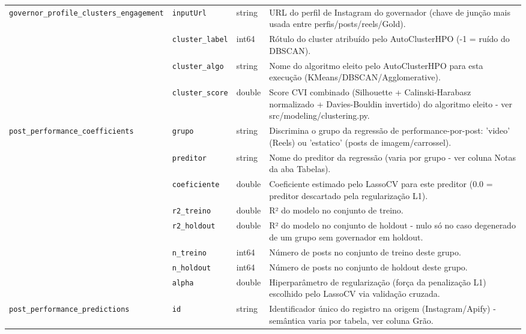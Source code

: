 \begin{footnotesize}
\begin{longtable}{p{3.2cm}p{3.0cm}p{2.0cm}p{6.0cm}}
\texttt{governor\_\allowbreak{}profile\_\allowbreak{}clusters\_\allowbreak{}engagement} & \texttt{inputUrl} & string & URL do perfil de Instagram do governador (chave de junção mais usada entre perfis/\allowbreak{}posts/\allowbreak{}reels/\allowbreak{}Gold). \\
\texttt{} & \texttt{cluster\_\allowbreak{}label} & int64 & Rótulo do cluster atribuído pelo AutoClusterHPO (-1 = ruído do DBSCAN). \\
\texttt{} & \texttt{cluster\_\allowbreak{}algo} & string & Nome do algoritmo eleito pelo AutoClusterHPO para esta execução (KMeans/\allowbreak{}DBSCAN/\allowbreak{}Agglomerative). \\
\texttt{} & \texttt{cluster\_\allowbreak{}score} & double & Score CVI combinado (Silhouette + Calinski-Harabasz normalizado + Davies-Bouldin invertido) do algoritmo eleito - ver src/\allowbreak{}modeling/\allowbreak{}clustering.py. \\
\texttt{post\_\allowbreak{}performance\_\allowbreak{}coefficients} & \texttt{grupo} & string & Discrimina o grupo da regressão de performance-por-post: 'video' (Reels) ou 'estatico' (posts de imagem/\allowbreak{}carrossel). \\
\texttt{} & \texttt{preditor} & string & Nome do preditor da regressão (varia por grupo - ver coluna Notas da aba Tabelas). \\
\texttt{} & \texttt{coeficiente} & double & Coeficiente estimado pelo LassoCV para este preditor (0.0 = preditor descartado pela regularização L1). \\
\texttt{} & \texttt{r2\_\allowbreak{}treino} & double & R² do modelo no conjunto de treino. \\
\texttt{} & \texttt{r2\_\allowbreak{}holdout} & double & R² do modelo no conjunto de holdout - nulo só no caso degenerado de um grupo sem governador em holdout. \\
\texttt{} & \texttt{n\_\allowbreak{}treino} & int64 & Número de posts no conjunto de treino deste grupo. \\
\texttt{} & \texttt{n\_\allowbreak{}holdout} & int64 & Número de posts no conjunto de holdout deste grupo. \\
\texttt{} & \texttt{alpha} & double & Hiperparâmetro de regularização (força da penalização L1) escolhido pelo LassoCV via validação cruzada. \\
\texttt{post\_\allowbreak{}performance\_\allowbreak{}predictions} & \texttt{id} & string & Identificador único do registro na origem (Instagram/\allowbreak{}Apify) - semântica varia por tabela, ver coluna Grão. \\

\end{longtable}
\end{footnotesize}
